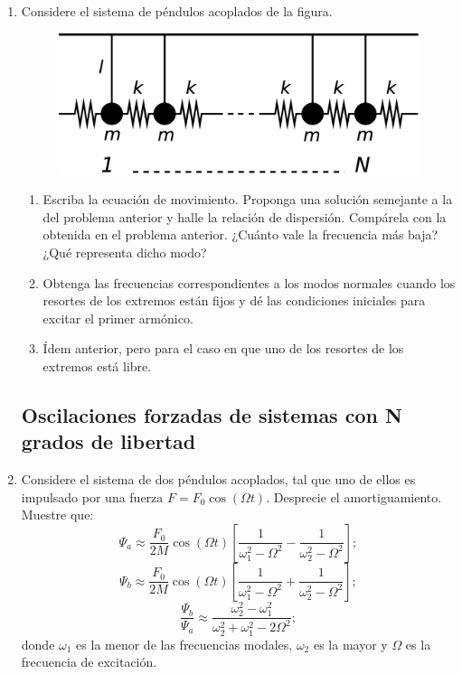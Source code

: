 \documentclass[11pt,spanish,a4paper]{article}
\begin{document}
\begin{enumerate}
\item Considere el sistema de péndulos acoplados de la figura. 
\begin{figure}[H]
\centering{}\includegraphics[clip,scale=0.25]{ej1-12}
\end{figure}
\begin{enumerate}
\item Escriba la ecuación de movimiento. Proponga una solución semejante
a la del problema anterior y halle la relación de dispersión. Compárela
con la obtenida en el problema anterior. ¿Cuánto vale la frecuencia
más baja? ¿Qué representa dicho modo? 
\item Obtenga las frecuencias correspondientes a los modos normales cuando
los resortes de los extremos están fijos y dé las condiciones iniciales
para excitar el primer armónico. 
\item Ídem anterior, pero para el caso en que uno de los resortes de los
extremos está libre. 
\end{enumerate}


\subsection*{Oscilaciones forzadas de sistemas con N grados de libertad}


\item Considere el sistema de dos péndulos acoplados, tal que uno de ellos
es impulsado por una fuerza $F=F_{0}\cos(\Omega t)$. Desprecie el
amortiguamiento. Muestre que:
\[
\Psi_{a}\approx\frac{F_{0}}{2M}\cos(\Omega t)\left[\frac{1}{\omega_{1}^{2}-\Omega^{2}} - \frac{1}{\omega_{2}^{2}-\Omega^{2}}\right];
\]
\[
\Psi_{b}\approx\frac{F_{0}}{2M}\cos(\Omega t)\left[\frac{1}{\omega_{1}^{2}-\Omega^{2}} + \frac{1}{\omega_{2}^{2}-\Omega^{2}}\right];
\]
\[
\frac{\Psi_{b}}{\Psi_{a}}\approx\frac{\omega_{2}^{2}-\omega_{1}^{2}}{\omega_{2}^{2}+\omega_{1}^{2}-2\Omega^{2}};
\]
donde $\omega_{1}$ es la menor de las frecuencias modales, $\omega_{2}$
es la mayor y $\Omega$ es la frecuencia de excitación.




\end{enumerate}
\end{document}

